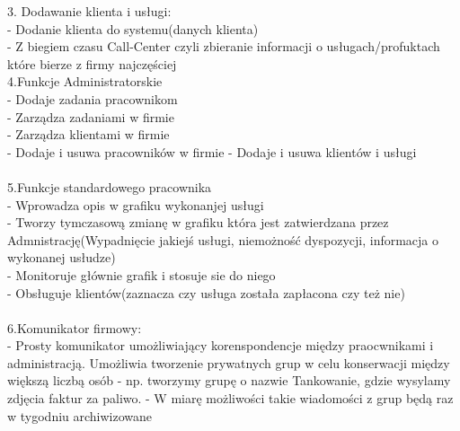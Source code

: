 3. Dodawanie klienta i usługi: 
    \\- Dodanie klienta do systemu(danych klienta)
    \\- Z biegiem czasu Call-Center czyli zbieranie informacji o usługach/profuktach które bierze z firmy najczęściej \\ 
    
4.Funkcje Administratorskie \\ 
 - Dodaje zadania pracownikom \\
 - Zarządza zadaniami w firmie \\
 - Zarządza klientami w firmie \\
 - Dodaje i usuwa pracowników w firmie
 - Dodaje i usuwa klientów i usługi 
\\ \\ 
5.Funkcje  standardowego pracownika\\
- Wprowadza opis w grafiku wykonanjej usługi \\
- Tworzy tymczasową zmianę w grafiku która jest zatwierdzana przez Admnistrację(Wypadnięcie jakiejś usługi, niemożność dyspozycji, informacja o wykonanej usłudze)\\
- Monitoruje głównie grafik i stosuje sie do niego \\
- Obsługuje klientów(zaznacza czy usługa została zapłacona czy też nie)
\\ \\
6.Komunikator firmowy: \\ 
- Prosty komunikator umożliwiający korenspondencje między praocwnikami i administracją. Umożliwia tworzenie prywatnych grup w celu konserwacji między większą liczbą osób - np. tworzymy grupę o nazwie Tankowanie, gdzie wysylamy zdjęcia faktur za paliwo.
- W miarę możliwości takie wiadomości z grup będą raz w tygodniu archiwizowane












